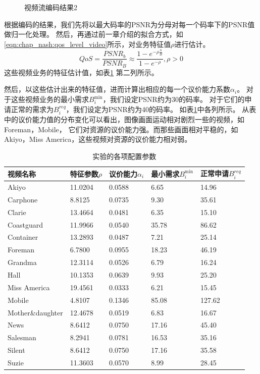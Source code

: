 \begin{figure}[tb]
\begin{minipage}[t]{0.5\linewidth}
    \caption{视频流编码结果2} 
    \label{fig:chap_nash:video_psnr2} 
  \end{minipage} 
\end{figure}

根据编码的结果，我们先将以最大码率的PSNR为分母对每一个码率下的PSNR值做归一化处理。
然后，再通过前一章介绍的拟合方式，如\eqref{eqn:chap_nash:qos_level_video}所示，对业务特征值$\rho$进行估计。
\begin{equation}
QoS = \frac{PSNR_b}{PSNR_B} \approx \frac{1- e^{-\rho \frac{b}{B} }}{1-e^{-\rho}}, \rho > 0
\label{eqn:chap_nash:qos_level_video}
\end{equation}
这些视频业务的特征估计值，如表\ref{tab:chap_nash:before_simulation} 第二列所示。

然后，以这些估计出来的特征值，进而计算出相应的每一个议价能力系数$\alpha_i$。
对于这些视频业务的最小需求$B_i^{\min}$，我们设定PSNR约为30的码率。
对于它们的申请正常的需求为$B_i^{req}$，我们设定为PSNR约为40的码率。
如表\ref{tab:chap_nash:before_simulation}中各列所示。
从表中的议价能力值的分布变化可以看出，图像画面运动相对剧烈一些的视频，如Foreman，Mobile，
它们对资源的议价能力强。而那些画面相对平稳的，如Akiyo，Miss America，这些视频对资源的议价能力相对弱。
\begin{table}[tb]
    \wuhao
    \centering
    \caption{实验的各项配置参数}
    \begin{tabular*}{0.98\textwidth}{l p{}  p{}  p{}  p{} } 
    \toprule
    视频名称 &特征参数$\rho$ & 议价能力$\alpha_i$ & 最小需求$B_i^{\min}$ & 正常申请$B_i^{req}$ \\
    \midrule
Akiyo           	 & 11.0204 & 0.0588 & 6.65 & 14.96  \\ 
Carphone        	 & 8.8125 & 0.0735 & 9.30 & 35.61  \\ 
Clarie          	 & 13.4664 & 0.0481 & 6.35 & 15.10  \\ 
Coastguard      	 & 11.9966 & 0.0540 & 35.78 & 86.62  \\ 
Container       	 & 13.2893 & 0.0487 & 7.21 & 25.14  \\ 
Foreman         	 & 6.7800 & 0.0955 & 18.23 & 46.19  \\ 
Grandma         	 & 12.3114 & 0.0526 & 6.79 & 16.24  \\ 
Hall            	 & 10.1353 & 0.0639 & 9.93 & 25.20  \\ 
Miss America    	 & 19.4561 & 0.0333 & 6.21 & 15.45  \\ 
Mobile          	 & 4.8107 & 0.1346 & 85.08 & 127.62  \\ 
Mother\&daughter	 & 12.4678 & 0.0519 & 6.83 & 16.67  \\ 
News            	 & 8.6412 & 0.0750 & 17.16 & 45.40  \\ 
Salesman        	 & 8.2941 & 0.0781 & 16.53 & 35.16  \\ 
Silent          	 & 8.6412 & 0.0750 & 17.16 & 35.58  \\ 
Suzie           	 & 11.3603 & 0.0570 & 8.99 & 28.45  \\ 
    \bottomrule
         \end{tabular*}
    \label{tab:chap_nash:before_simulation}
\end{table}

